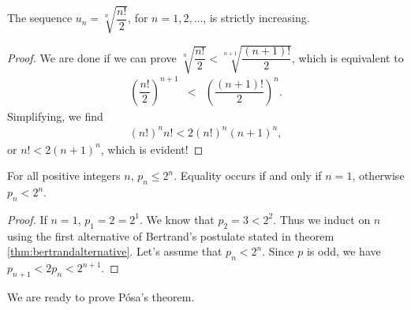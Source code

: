 \documentclass{subfiles}
\begin{document}
	\begin{lemma}
		The sequence $u_n=\sqrt[n]{\dfrac{n!}{2}}$, for $n=1,2,\ldots$, is strictly increasing.\label{lem:n!/2}
	\end{lemma}
	
	\begin{proof}
		We are done if we can prove $\sqrt[n]{\dfrac{n!}{2}}<\sqrt[n+1]{\dfrac{(n+1)!}{2}}$, which is equivalent to
			\begin{eqnarray*}
				\left(\dfrac{n!}{2}\right)^{n+1}  & < & \left(\dfrac{(n+1)!}{2}\right)^n.
			\end{eqnarray*}
		Simplifying, we find
			\begin{eqnarray*}
			 (n!)^n n! <  2(n!)^n(n+1)^n,
			\end{eqnarray*}
		or $n!  <  2(n+1)^n$, which is evident!
	\end{proof}
	
	\begin{lemma}
		For all positive integers $n$, $p_{n}\leq 2^{n}$. Equality occurs if and only if $n=1$, otherwise $p_n<2^n$.\label{lem:p_n<2^n}
	\end{lemma}
	
	\begin{proof}
		If $n=1$, $p_1=2=2^1$. We know that $p_2=3<2^2$. Thus we induct on $n$ using the first alternative of Bertrand's postulate stated in theorem \eqref{thm:bertrandalternative}. Let's assume that $p_n<2^n$. Since $p$ is odd, we have $p_{n+1}<2p_n<2^{n+1}$.
	\end{proof}
	
	We are ready to prove P\'{o}sa's theorem.
	
\end{document}
